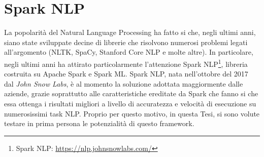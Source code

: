 \section{Spark NLP}
La popolarità del Natural Language Processing ha fatto si che, negli ultimi anni, siano state sviluppate decine di librerie che risolvono numerosi problemi legati all'argomento (NLTK, SpaCy, Stanford Core NLP e molte altre). In particolare, negli ultimi anni ha attirato particolarmente l'attenzione Spark NLP\footnote{Spark NLP: \href{https://nlp.johnsnowlabs.com/}{https://nlp.johnsnowlabs.com/}}, libreria costruita su Apache Spark e Spark ML. Spark NLP, nata nell'ottobre del 2017 dal \textit{John Snow Labs}, è al momento la soluzione adottata maggiormente dalle aziende, grazie soprattutto alle caratteristiche ereditate da Spark che fanno si che essa ottenga i risultati migliori a livello di accuratezza e velocità di esecuzione su numerosissimi task NLP. Proprio per questo motivo, in questa Tesi, si sono volute testare in prima persona le potenzialità di questo framework.




\clearpage